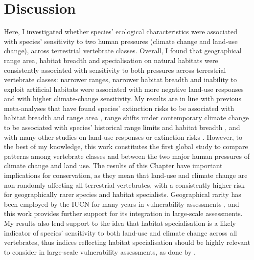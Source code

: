 \clearpage

\section{Discussion}
Here, I investigated whether species' ecological characteristics were associated with species' sensitivity to two human pressures (climate change and land-use change), across terrestrial vertebrate classes. Overall, I found that geographical range area, habitat breadth and specialisation on natural habitats were consistently associated with sensitivity to both pressures across terrestrial vertebrate classes: narrower ranges, narrower habitat breadth and inability to exploit artificial habitats were associated with more negative land-use responses and with higher climate-change sensitivity. My results are in line with previous meta-analyses that have found species' extinction risks to be associated with habitat breadth and range area \citep{Chichorro2019}, range shifts under contemporary climate change to be associated with species' historical range limits and habitat breadth \citep{MacLean2017}, and with many other studies on land-use responses or extinction risks \citep{Ripple2017, Newbold2018a, Nowakowski2017}. However, to the best of my knowledge, this work constitutes the first global study to compare patterns among vertebrate classes and between the two major human pressures of climate change and land use. The results of this Chapter have important implications for conservation, as they mean that land-use and climate change are non-randomly affecting all terrestrial vertebrates, with a consistently higher risk for geographically rarer species and habitat specialists. Geographical rarity has been employed by the IUCN for many years in vulnerability assessments \citep{Rodrigues2006}, and this work provides further support for its integration in large-scale assessments. My results also lend support to the idea that habitat specialisation is a likely indicator of species' sensitivity to both land-use and climate change across all vertebrates, thus indices reflecting habitat specialisation should be highly relevant to consider in large-scale vulnerability assessments, as done by \citet{Foden2013}. 

